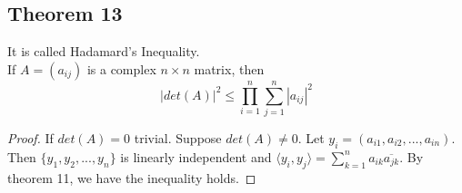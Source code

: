 \documentclass{article}
\begin{document}
\subsection*{Theorem 13}
It is called Hadamard's Inequality.\\
If $A=(a_{ij})$ is a complex $n\times n$ matrix, then 
\[
|det(A)|^2\leq\prod_{i=1}^{n}\sum_{j=1}^{n}|a_{ij}|^2
\]
\begin{proof}
If $det(A)=0$ trivial. Suppose $det(A)\neq 0 $. Let $y_i = (a_{i1},a_{i2},...,a_{in})$. Then $\{y_1,y_2,...,y_n\}$ is linearly independent and $\langle y_i, y_j \rangle = \sum_{k=1}^{n} a_{ik}\overline{a_{jk}}$. By theorem 11, we have the inequality holds.
\end{proof}
\end{document}
